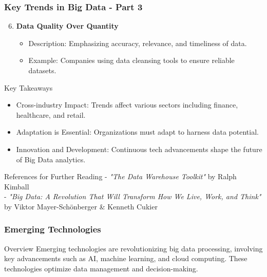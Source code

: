 \documentclass[aspectratio=169]{beamer}
\begin{document}
\begin{frame}[fragile]
    \frametitle{Key Trends in Big Data - Part 3}
    \begin{enumerate}
        \setcounter{enumi}{5}  %
        \item \textbf{Data Quality Over Quantity}
            \begin{itemize}
                \item Description: Emphasizing accuracy, relevance, and timeliness of data.
                \item Example: Companies using data cleansing tools to ensure reliable datasets.
            \end{itemize}
    \end{enumerate}
    
    \begin{block}{Key Takeaways}
        \begin{itemize}
            \item Cross-industry Impact: Trends affect various sectors including finance, healthcare, and retail.
            \item Adaptation is Essential: Organizations must adapt to harness data potential.
            \item Innovation and Development: Continuous tech advancements shape the future of Big Data analytics.
        \end{itemize}
    \end{block}
    
    \begin{block}{References for Further Reading}
        - \textit{"The Data Warehouse Toolkit"} by Ralph Kimball \\
        - \textit{"Big Data: A Revolution That Will Transform How We Live, Work, and Think"} by Viktor Mayer-Schönberger \& Kenneth Cukier
    \end{block}
\end{frame}

\begin{frame}[fragile]
    \frametitle{Emerging Technologies}
    \begin{block}{Overview}
        Emerging technologies are revolutionizing big data processing, involving key advancements such as AI, machine learning, and cloud computing. These technologies optimize data management and decision-making.
    \end{block}
\end{frame}
\end{document}
